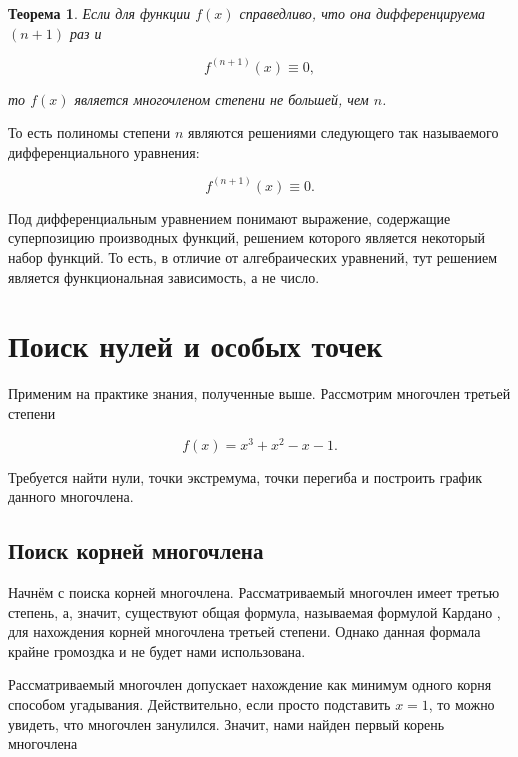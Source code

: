 \documentclass[12pt]{article}
\newtheorem{theorem}{Теорема}[section]
\begin{document}
\begin{theorem}
	Если для функции $f(x)$ справедливо, что она дифференцируема $(n+1)$ раз и

	\begin{equation}
		f^{(n+1)}(x) \equiv 0,
	\end{equation}

	то $f(x)$ является многочленом степени не большей, чем $n$.
\end{theorem}

То есть полиномы степени $n$ являются решениями следующего так называемого дифференциального уравнения:

\begin{equation}
		f^{(n+1)}(x) \equiv 0.
\end{equation}

Под дифференциальным уравнением понимают выражение, содержащие суперпозицию производных функций, решением которого является некоторый набор функций. То есть, в отличие от алгебраических уравнений, тут решением является функциональная зависимость, а не число.

\section{Поиск нулей и особых точек}
Применим на практике знания, полученные выше. Рассмотрим многочлен третьей степени

\begin{equation}
	f(x) = x^3 + x^2 -x -1.
\end{equation}

Требуется найти нули, точки экстремума, точки перегиба и построить график данного многочлена.

\subsection{Поиск корней многочлена} %
Начнём с поиска корней многочлена. Рассматриваемый многочлен имеет третью степень, а, значит, существуют общая формула, называемая формулой Кардано \cite{root3}, для нахождения корней многочлена третьей степени. Однако данная формала крайне громоздка и не будет нами использована.

\par Рассматриваемый многочлен допускает нахождение как минимум одного корня способом угадывания. Действительно, если просто подставить $x=1$, то можно увидеть, что многочлен занулился. Значит, нами найден первый корень многочлена
\end{document}
